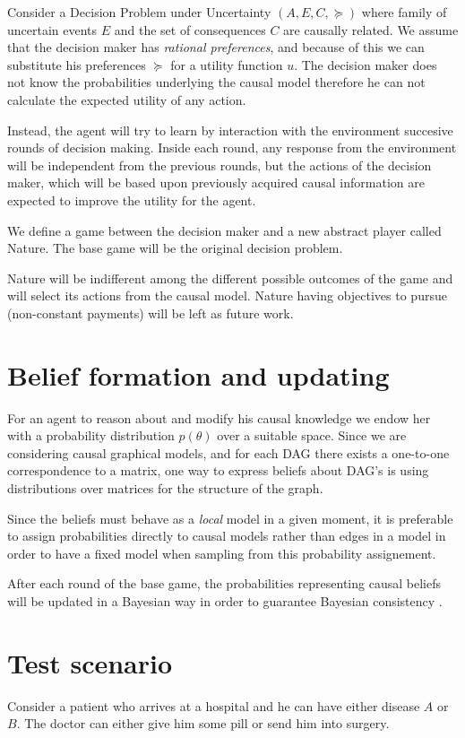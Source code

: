 \documentclass{article}
\begin{document}
Consider a Decision Problem under Uncertainty $(A,E,C,\succeq)$ where family of uncertain events $E$ and the set of consequences $C$ are causally related. We assume that the decision maker has \textit{rational preferences}, and because of this we can substitute his preferences $\succeq$ for a utility function $u$. The decision maker does not know the probabilities underlying the causal model therefore he can not calculate the expected utility of any action. 

Instead, the agent will try to learn by interaction with the environment succesive rounds of decision making. Inside each round, any response from the environment will be independent from the previous rounds, but the actions of the decision maker, which will be based upon previously acquired causal information are expected to improve the utility for the agent.

We define a game between the decision maker and a new abstract player called Nature. The base game will be the original decision problem.

Nature will be indifferent among the different possible outcomes of the game and will select its actions from the causal model. Nature having objectives to pursue (non-constant payments) will be left as future work.

\section{Belief formation and updating}
For an agent to reason about and modify his causal knowledge we endow her with a probability distribution $p(\theta)$ over a suitable space. Since we are considering causal graphical models, and for each DAG there exists a one-to-one correspondence to a matrix, one way to express beliefs about DAG's is using distributions over matrices for the structure of the graph.

Since the beliefs must behave as a \textit{local} model in a given moment, it is preferable to assign probabilities directly to causal models rather than edges in a model in order to have a fixed model when sampling from this probability assignement.

After each round of the base game, the probabilities representing causal beliefs will be updated in a Bayesian way in order to guarantee Bayesian consistency \cite{shoham2008multiagent}.
\section{Test scenario}
Consider a patient who arrives at a hospital and he can have either disease $A$ or $B$. The doctor can either give him some pill or send him into surgery. 
\end{document}
